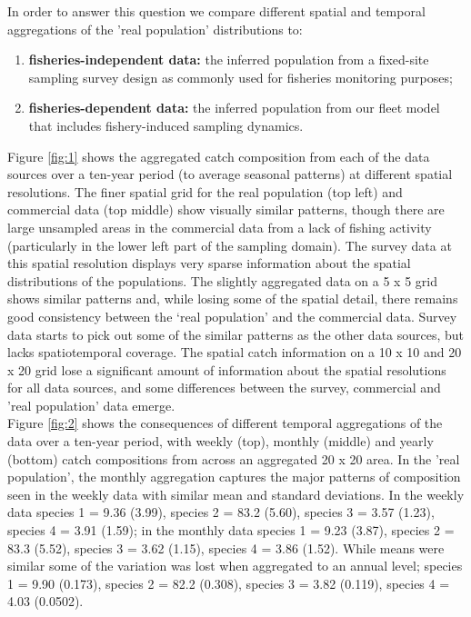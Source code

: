 \documentclass[review]{elsarticle}
\begin{document}
In order to answer this question we compare different spatial and temporal
aggregations of the 'real population' distributions to:
\begin{enumerate}[label=\alph*)]
	\item \textbf{fisheries-independent data:} the inferred population from
		a fixed-site sampling survey design as commonly used for
		fisheries monitoring purposes;
	\item \textbf{fisheries-dependent data:} the inferred population from
		our fleet model that includes fishery-induced sampling
		dynamics.
\end{enumerate}

Figure \ref{fig:1} shows the aggregated catch composition from each of the data
sources over a ten-year period (to average seasonal patterns) at different
spatial resolutions. The finer spatial grid for the real population (top left)
and commercial data (top middle) show visually similar patterns, though there
are large unsampled areas in the commercial data from a lack of fishing
activity (particularly in the lower left part of the sampling domain). The
survey data at this spatial resolution displays very sparse information about
the spatial distributions of the populations. The slightly aggregated data on a
5 x 5 grid shows similar patterns and, while losing some of the spatial detail,
there remains good consistency between the `real population' and the commercial
data. Survey data starts to pick out some of the similar patterns as the other
data sources, but lacks spatiotemporal coverage. The spatial catch information
on a 10 x 10 and 20 x 20 grid lose a significant amount of information about
the spatial resolutions for all data sources, and some differences between the
survey, commercial and 'real population' data emerge. \\

Figure \ref{fig:2} shows the consequences of different temporal aggregations of
the data over a ten-year period, with weekly (top), monthly (middle) and yearly
(bottom) catch compositions from across an aggregated 20 x 20 area. In the
'real population', the monthly aggregation captures the major patterns of
composition seen in the weekly data with similar mean and standard deviations.
In the weekly data species 1 = 9.36 (3.99), species 2 = 83.2 (5.60), species 3
= 3.57 (1.23), species 4 = 3.91 (1.59); in the monthly data species 1 = 9.23
(3.87), species 2 = 83.3 (5.52), species 3 = 3.62 (1.15), species 4 = 3.86
(1.52). While means were similar some of the variation was lost when aggregated
to an annual level; species 1 = 9.90 (0.173), species 2 = 82.2 (0.308), species
3 = 3.82 (0.119), species 4 = 4.03 (0.0502).\\
\end{document}
